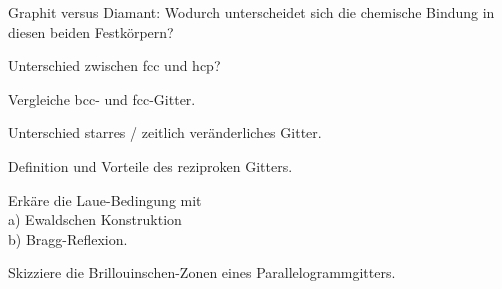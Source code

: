 \documentclass[a5paper,12pt,ngerman,print,grid=front]{kartei}
\begin{document}
	\begin{karte}{
		Graphit versus Diamant: Wodurch unterscheidet sich die chemische Bindung in diesen
		beiden Festkörpern?
		}
		
		
		
	\end{karte}


	\begin{karte}{
		Unterschied zwischen fcc und hcp?
		}
		
		
		
	\end{karte}


	\begin{karte}{
		Vergleiche bcc- und fcc-Gitter.
		}
		
		
		
	\end{karte}


	\begin{karte}{
		Unterschied starres / zeitlich veränderliches Gitter.
		}
		
		
		
	\end{karte}


	\begin{karte}{
		Definition und Vorteile des reziproken Gitters.
		}
		
		
		
	\end{karte}


	\begin{karte}{
		Erkäre die Laue-Bedingung mit \\
		a) Ewaldschen Konstruktion \\
		b) Bragg-Reflexion.
		}
		
		
		
	\end{karte}


	\begin{karte}{
		Skizziere die Brillouinschen-Zonen eines Parallelogrammgitters.
		}
		
		
		
	\end{karte}
\end{document}
